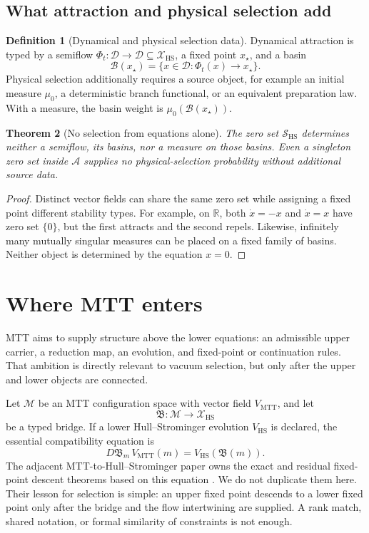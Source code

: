 \documentclass[11pt]{article}
\newcommand{\R}{\mathbb{R}}
\newcommand{\cA}{\mathcal{A}}
\newcommand{\cB}{\mathcal{B}}
\newcommand{\cD}{\mathcal{D}}
\newcommand{\cM}{\mathcal{M}}
\newcommand{\cS}{\mathcal{S}}
\newcommand{\cX}{\mathcal{X}}
\newcommand{\HS}{\mathrm{HS}}
\newcommand{\MTT}{\mathrm{MTT}}
\numberwithin{equation}{section}
\theoremstyle{definition}
\newtheorem{definition}{Definition}[section]
\theoremstyle{plain}
\newtheorem{theorem}[definition]{Theorem}
\theoremstyle{remark}
\begin{document}
\subsection{What attraction and physical selection add}

\begin{definition}[Dynamical and physical selection data]
Dynamical attraction is typed by a semiflow
\(\Phi_t:\cD\to\cD\subseteq\cX_{\HS}\), a fixed point \(x_\star\), and a
basin
\[
\cB(x_\star)=\{x\in\cD:\Phi_t(x)\to x_\star\}.
\]
Physical selection additionally requires a source object, for example an
initial measure \(\mu_0\), a deterministic branch functional, or an
equivalent preparation law.  With a measure, the basin weight is
\(\mu_0(\cB(x_\star))\).
\end{definition}

\begin{theorem}[No selection from equations alone]\label{thm:no-selection}
The zero set \(\cS_{\HS}\) determines neither a semiflow, its basins, nor a
measure on those basins.  Even a singleton zero set inside \(\cA\) supplies
no physical-selection probability without additional source data.
\end{theorem}

\begin{proof}
Distinct vector fields can share the same zero set while assigning a fixed
point different stability types.  For example, on \(\R\), both
\(\dot x=-x\) and \(\dot x=x\) have zero set \(\{0\}\), but the first attracts
and the second repels.  Likewise, infinitely many mutually singular measures
can be placed on a fixed family of basins.  Neither object is determined by
the equation \(x=0\).
\end{proof}

\section{Where MTT enters}

MTT aims to supply structure above the lower equations: an admissible upper
carrier, a reduction map, an evolution, and fixed-point or continuation
rules.  That ambition is directly relevant to vacuum selection, but only
after the upper and lower objects are connected.

Let \(\cM\) be an MTT configuration space with vector field \(V_{\MTT}\), and
let
\[
\mathfrak{B}:\cM\longrightarrow\cX_{\HS}
\]
be a typed bridge.  If a lower Hull--Strominger evolution \(V_{\HS}\) is
declared, the essential compatibility equation is
\[
D\mathfrak{B}_m\,V_{\MTT}(m)
=V_{\HS}(\mathfrak{B}(m)).
\tag{4.1}\label{eq:intertwine}
\]
The adjacent MTT-to-Hull--Strominger paper owns the exact and residual
fixed-point descent theorems based on this equation
\cite{NeroMTTStrominger2026}.  We do not duplicate them here.  Their lesson
for selection is simple: an upper fixed point descends to a lower fixed point
only after the bridge and the flow intertwining are supplied.  A rank match,
shared notation, or formal similarity of constraints is not enough.
\end{document}
